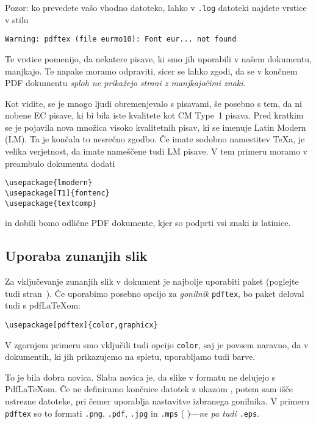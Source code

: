 Pozor: ko prevedete vašo vhodno datoteko, lahko
v \texttt{.log} datoteki najdete vrstice v stilu
\begin{verbatim}
Warning: pdftex (file eurmo10): Font eur... not found
\end{verbatim}
Te vrstice pomenijo, da nekatere pisave, ki smo jih uporabili v našem dokumentu,
manjkajo. Te napake moramo odpraviti, sicer se lahko zgodi, da se
v končnem PDF dokumentu 
\emph{sploh ne prikažejo strani z manjkajočimi znaki}.


Kot vidite, se je mnogo ljudi obremenjevalo s pisavami, še posebno s tem,
da ni nobene EC pisave, ki bi bila iste kvalitete kot CM Type~1 pisava.
Pred kratkim se je pojavila nova množica visoko kvalitetnih pisav,
ki se imenuje  Latin Modern (LM). Ta je končala to nesrečno zgodbo.
Če imate sodobno namestitev \TeX{}a, je velika verjetnost,
da imate nameščene tudi LM pisave. V tem primeru moramo v 
preambulo dokumenta  dodati
\begin{code}
\begin{verbatim}  
\usepackage{lmodern}
\usepackage[T1]{fontenc} 
\usepackage{textcomp}
\end{verbatim}
\end{code}
in dobili bomo odlične PDF dokumente, kjer so podprti vsi 
znaki iz latinice.


\subsection{Uporaba zunanjih slik}
\label{ssec:pdfgraph}

Za vključevanje zunanjih slik v dokument je najbolje uporabiti 
paket  (poglejte tudi stran~\pageref{eps}). 
Če uporabimo posebno opcijo za \emph{gonilnik} 
\texttt{pdftex}, bo paket 
deloval tudi s pdf\LaTeX{}om:
\begin{code}
\begin{verbatim}
\usepackage[pdftex]{color,graphicx}
\end{verbatim}
\end{code}
V zgornjem primeru smo vključili tudi opcijo \texttt{color}, saj je
povsem naravno, da v dokumentih, ki jih prikazujemo na spletu, 
uporabljamo tudi barve.

To je bila dobra novica. Slaba novica je, da slike v \EPSi{}
formatu ne delujejo s Pdf\LaTeX{}om. Če ne definiramo končnice
datotek z ukazom , potem  sam išče
ustrezne datoteke, pri čemer uporablja nastavitve izbranega gonilnika.
V primeru \texttt{pdftex} so to formati \texttt{.png}, \texttt{.pdf}, \texttt{.jpg} in \texttt{.mps} (
\MP{})---\emph{ne pa tudi} \texttt{.eps}.

